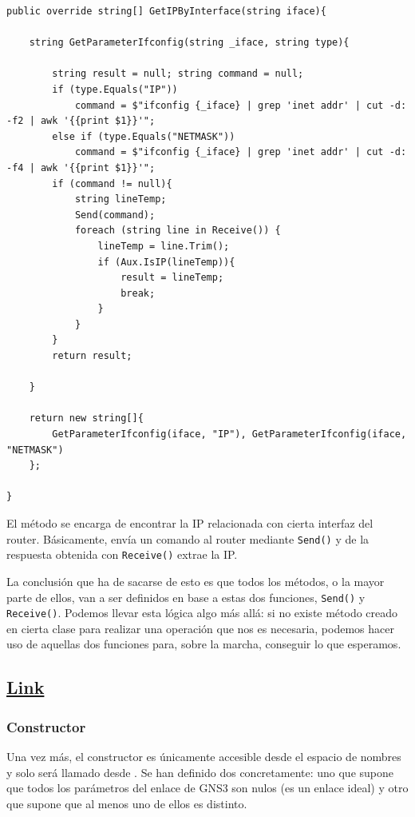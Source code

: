 \begin{lstlisting}[language={[Sharp]C}, caption={Método \texttt{GetIPByInterface()} de \texttt{OpenWRT}}, label={herederosnode2}]
public override string[] GetIPByInterface(string iface){

    string GetParameterIfconfig(string _iface, string type){

        string result = null; string command = null;
        if (type.Equals("IP"))
            command = $"ifconfig {_iface} | grep 'inet addr' | cut -d: -f2 | awk '{{print $1}}'";
        else if (type.Equals("NETMASK"))
            command = $"ifconfig {_iface} | grep 'inet addr' | cut -d: -f4 | awk '{{print $1}}'";
        if (command != null){
            string lineTemp;
            Send(command);
            foreach (string line in Receive()) {
                lineTemp = line.Trim();
                if (Aux.IsIP(lineTemp)){
                    result = lineTemp;
                    break;
                }
            }
        }
        return result;

    }

    return new string[]{ 
        GetParameterIfconfig(iface, "IP"), GetParameterIfconfig(iface, "NETMASK") 
    };
    
}
\end{lstlisting}

El método se encarga de encontrar la IP relacionada con cierta interfaz del router. Básicamente, envía un comando al router mediante \texttt{Send()} y de la respuesta obtenida con \texttt{Receive()} extrae la IP.

La conclusión que ha de sacarse de esto es que todos los métodos, o la mayor parte de ellos, van a ser definidos en base a estas dos funciones, \texttt{Send()} y \texttt{Receive()}. Podemos llevar esta lógica algo más allá: si no existe método creado en cierta clase para realizar una operación que nos es necesaria, podemos hacer uso de aquellas dos funciones para, sobre la marcha, conseguir lo que esperamos.

\subsection[Link]{\href{https://github.com/aorestr/GNS3sharp/blob/master/link.cs}{Link}}
\subsubsection{Constructor}
Una vez más, el constructor es únicamente accesible desde el espacio de nombres y solo será llamado desde \GNSCS. Se han definido dos concretamente: uno que supone que todos los parámetros del enlace de GNS3 son nulos (es un enlace ideal) y otro que supone que al menos uno de ellos es distinto.

